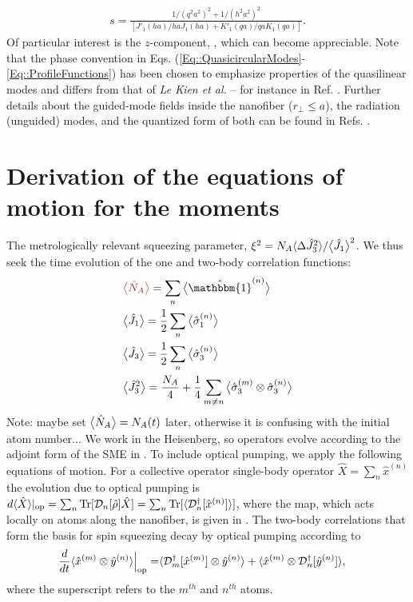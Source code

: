 \documentclass[preprint,aps,pra,onecolumn]{revtex4-1} %
\newcommand{\comment}[1]{{\color{Maroon} #1}}
\begin{document}
\begin{appendix}
	\begin{align}
		s = \frac{1/(q^2 a^2)^{2} + 1/(h^2 a^2)^{2}}{[J'_1(ha)/haJ_1(ha) + K'_1(qa)/qaK_1(qa)]}.
	\end{align}  
Of particular interest is the $z$-component, , which can become appreciable.  Note that the phase convention in Eqs. (\ref{Eq::QuasicircularModes}-\ref{Eq::ProfileFunctions}) has been chosen to emphasize properties of the quasilinear modes and differs from that of \emph{Le Kien et al.} -- for instance in Ref. \cite{le_kien_propagation_2014}.  
Further details about the guided-mode fields inside the nanofiber ($r_\perp\leq a$), the radiation (unguided) modes, and the quantized form of both can be found in Refs. \cite{sondergaard_general_2001, tong_single-mode_2004, kien_field_2004, le_kien_spontaneous_2005, Vetsch thesis}.


\section{Derivation of the equations of motion for the moments} \label{Appendix::OpticalPumping}	
The metrologically relevant squeezing parameter, $\xi^2 = N_A \langle{\Delta \hat{J}_3^2}\rangle/\big\langle \hat{J}_1 \big\rangle^2$.  
We thus seek the time evolution of the one and two-body correlation functions:
\begin{align}
&\comment{\expect{\hat{N}_A}} = \sum_n \expect{\hat{\mathbbm{1}}^{(n)}} \\
&\expect{\hat{J}_1} = \frac{1}{2} \sum_n \expect{\hat{\sigma}_1^{(n)}} \\
&\expect{\hat{J}_3} = \frac{1}{2} \sum_n \expect{\hat{\sigma}_3^{(n)}} \\
&\expect{\hat{J}_3^2} = \frac{N_A}{4} +\frac{1}{4} \sum_{m \neq n} \expect{\hat{\sigma}_3^{(m)}\otimes \hat{\sigma}_3^{(n)}} 
\end{align}
\comment{Note: maybe set $ \big\langle \hat{N}_A \big\rangle=N_A(t) $ later, otherwise it is confusing with the initial atom number...}
We work in the Heisenberg, so operators evolve according to the adjoint form of the SME in . 
To include optical pumping, we apply the following equations of motion. For a collective operator single-body operator $\hat{X} = \sum_n \hat{x}^{(n)}$ the evolution due to optical pumping is $d\langle{ \hat{X}}\rangle|_{\rm op} = \sum_n \mbox{Tr} [\mathcal{D}_n[\hat{\rho}]\hat{X} ] = \sum_n \mbox{Tr} [\langle{\mathcal{D}_n^\dagger[\hat{x}^{(n)}]}\rangle ] $, where the map, which acts locally on atoms along the nanofiber, is given in .  
The two-body correlations that form the basis for spin squeezing decay by optical pumping  according to \cite{baragiola_three-dimensional_2014}
	\begin{align}
		\frac{d}{dt} \langle{ \hat{x}^{(m)} \otimes \hat{y}^{(n)} }\rangle \Big|_{\rm op}= &\langle{ \mathcal{D}_m^\dagger[ \hat{x}^{(m)}] \otimes \hat{y}^{(n)} }\rangle + \langle{ \hat{x}^{(m)}\otimes \mathcal{D}_n^\dagger[ \hat{y}^{(n)}] }\rangle,
	\end{align}
where the superscript refers to the $m^{th}$ and $n^{th}$ atoms. 


\end{appendix}
\end{document}

